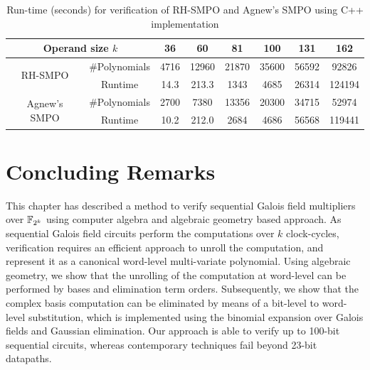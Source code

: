 \begin{table}[hbt]
\centering
\caption{\small Run-time (seconds) for verification of
  RH-SMPO and Agnew's SMPO using C++ implementation}
\label{tab:Cpp}
{\small 
\begin{tabular}{|c|c||c|c|c|c|c|c|}
\hline
\multicolumn{2}{|c||}{\centering Operand size $k$} & 36 & 60 & 81 & 100 & 131 & 162 \\
\hline
\multirow{2}{2cm}{\centering RH-SMPO} & \#Polynomials & 4716 & 12960 & 21870 & 35600 & 56592 & 92826 \\
\cline{2-8}
 & Runtime & 14.3 & 213.3 & 1343 & 4685 & 26314 & 124194 \\
\hline
\multirow{2}{2cm}{\centering Agnew's SMPO} & \#Polynomials & 2700 & 7380 & 13356 & 20300 & 34715 & 52974 \\
\cline{2-8}
 & Runtime & 10.2 & 212.0 & 2684 & 4686 & 56568 & 119441 \\
 
 \hline

 
\end{tabular}
}
\end{table}


\section{Concluding Remarks}

This chapter has described a method to verify sequential Galois field
multipliers over ${\mathbb{F}}_{2^k}$ using computer algebra and algebraic geometry
based approach. As sequential Galois field circuits perform the
computations over $k$ clock-cycles, verification requires an efficient
approach to unroll the computation, and represent it as a canonical
word-level multi-variate polynomial. Using algebraic geometry, we show
that the unrolling of the computation at word-level can be performed by
\Grobner bases and elimination term orders. Subsequently, we show
that the complex \Grobner basis computation can be eliminated by means
of a bit-level to word-level substitution, which is implemented using
the binomial expansion over Galois fields and Gaussian
elimination. Our approach is able to verify up to 100-bit sequential
circuits, whereas contemporary techniques fail beyond 23-bit
datapaths.  

